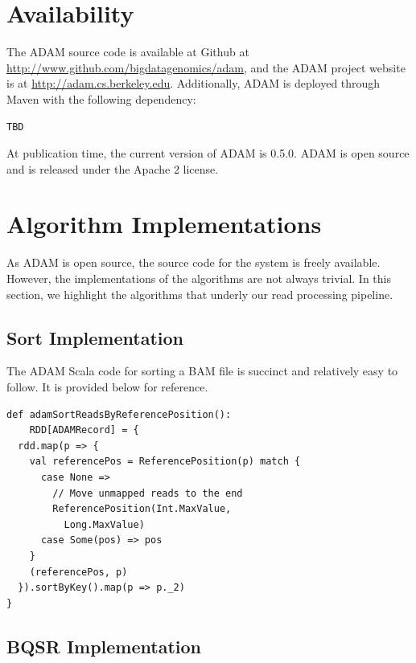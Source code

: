 \documentclass[10pt,twocolumn]{article}
\theoremstyle{plain}
\begin{document}
\appendix

\section{Availability}
\label{sec:availability}

The ADAM source code is available at Github at \url{http://www.github.com/bigdatagenomics/adam}, and the ADAM project website
is at \url{http://adam.cs.berkeley.edu}. Additionally, ADAM is deployed through Maven with the following dependency:

\begin{verbatim}
TBD
\end{verbatim}

At publication time, the current version of ADAM is 0.5.0. ADAM is open source and is released under the Apache 2
license.

\section{Algorithm Implementations}
\label{sec:algorithm-implentations}

As ADAM is open source, the source code for the system is freely available. However, the implementations of the algorithms
are not always trivial. In this section, we highlight the algorithms that underly our read processing pipeline.

\subsection{Sort Implementation}
\label{sec:sort-implementation}

The ADAM Scala code for sorting a BAM file is succinct and relatively 
easy to follow. It is provided below for reference.

\begin{lstlisting}
def adamSortReadsByReferencePosition():
    RDD[ADAMRecord] = {
  rdd.map(p => {
    val referencePos = ReferencePosition(p) match {
      case None =>
        // Move unmapped reads to the end
        ReferencePosition(Int.MaxValue,
          Long.MaxValue)
      case Some(pos) => pos
    }
    (referencePos, p)
  }).sortByKey().map(p => p._2)
}
\end{lstlisting}

\subsection{BQSR Implementation}
\label{sec:bqsr-implementation}
\end{document}
